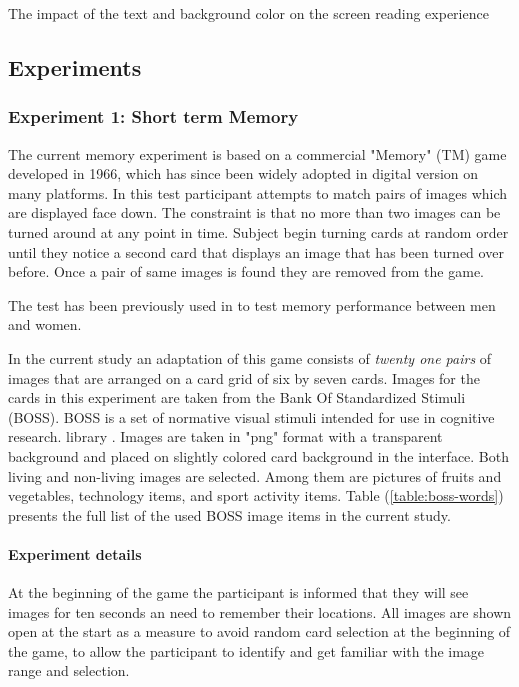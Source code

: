 	\cite{Zorko2017} The impact of the text and background color on the screen reading experience
	
	\clearpage
	\subsection{Experiments}

		\subsubsection{Experiment 1: Short term Memory} \label{sec:memory}
		
		The current memory experiment is based on a commercial "Memory" (TM) game developed in 1966, which has since been widely adopted in digital version on many platforms. 
		In this test participant attempts to match pairs of images which are displayed face down. 
		The constraint is that no more than two images can be turned around at any point in time. Subject begin turning cards at random order until they notice a second card that displays an image that has been turned over before. Once a pair of same images is found they are removed from the game.
		
		The test has been previously used in \cite{McBurney1997} to test memory performance between men and women.
		
		In the current study an adaptation of this game consists of \textit{twenty one pairs} of images that are arranged on a card grid of six by seven cards. Images for the cards in this experiment are taken from the Bank Of Standardized Stimuli (BOSS). BOSS is a set of normative visual stimuli intended for use in cognitive research. library \cite{Brodeur2010}. Images are taken in "png" format with a transparent background and placed on slightly colored card background in the interface. Both living and non-living images are selected. Among them are pictures of fruits and vegetables, technology items, and sport activity items.
		Table (\ref{table:boss-words}) presents the full list of the used BOSS image items in the current study.
		
		\paragraph{Experiment details}
		
		At the beginning of the game the participant is informed that they will see images for ten seconds an need to remember their locations. All images are shown open at the start as a measure to avoid random card selection at the beginning of the game, to allow the participant to identify and get familiar with the image range and selection.
		
